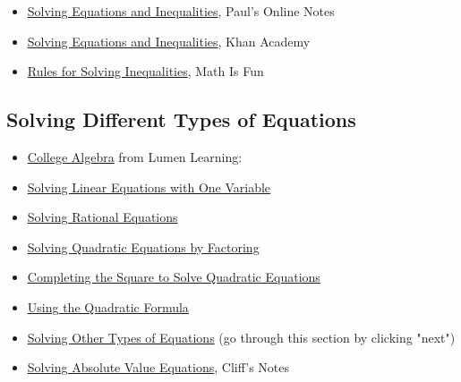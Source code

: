 \begin{itemize}
    \item \href{https://tutorial.math.lamar.edu/classes/alg/Solving.aspx}{Solving Equations and Inequalities}, Paul's Online Notes
    \item \href{https://www.khanacademy.org/math/algebra/x2f8bb11595b61c86:solve-equations-inequalities}{Solving Equations and Inequalities}, Khan Academy
    \item \href{https://www.mathsisfun.com/algebra/inequality-solving.html}{Rules for Solving Inequalities}, Math Is Fun
\end{itemize}


\subsection{Solving Different Types of Equations}
\label{sss:solv-7fb8}




\begin{itemize}
    \item \href{https://courses.lumenlearning.com/ivytech-collegealgebra/}{College Algebra} from Lumen Learning:
    \item \href{https://courses.lumenlearning.com/ivytech-collegealgebra/chapter/solving-linear-equations-in-one-variable/}{Solving Linear Equations with One Variable}
    \item \href{https://courses.lumenlearning.com/ivytech-collegealgebra/chapter/solving-a-rational-equation/}{Solving Rational Equations}
    \item \href{https://courses.lumenlearning.com/ivytech-collegealgebra/chapter/solving-quadratic-equations-by-factoring/}{Solving Quadratic Equations by Factoring}
    \item \href{https://courses.lumenlearning.com/ivytech-collegealgebra/chapter/completing-the-square/}{Completing the Square to Solve Quadratic Equations}
    \item \href{https://courses.lumenlearning.com/ivytech-collegealgebra/chapter/using-the-quadratic-formula/}{Using the Quadratic Formula}
    \item \href{https://courses.lumenlearning.com/ivytech-collegealgebra/chapter/introduction-other-types-of-equations/}{Solving Other Types of Equations} (go through this section by clicking "next")
    \item \href{https://www.cliffsnotes.com/study-guides/algebra/algebra-i/inequalities-graphing-and-absolute-value/solving-equations-containing-absolute-value}{Solving Absolute Value Equations}, Cliff's Notes
\end{itemize}


